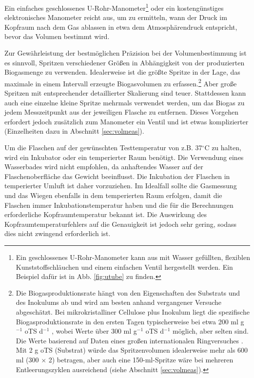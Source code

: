 \documentclass[]{article}
\begin{document}
Ein einfaches geschlossenes U-Rohr-Manometer\footnote{
  Ein geschlossenes U-Rohr-Manometer kann aus mit Wasser gefüllten, flexiblen Kunststoffschläuchen und einem einfachen Ventil hergestellt werden. Ein Beispiel dafür ist in Abb. \ref{fig:utube} zu finden.
} oder ein kostengünstiges elektronisches Manometer reicht aus, um zu ermitteln, wann der Druck im Kopfraum nach dem Gas ablassen in etwa dem Atmosphärendruck entspricht, bevor das Volumen bestimmt wird.

Zur Gewährleistung der bestmöglichen Präzision bei der Volumenbestimmung ist es sinnvoll, Spritzen verschiedener Größen in Abhängigkeit von der produzierten Biogasmenge zu verwenden.
Idealerweise ist die größte Spritze in der Lage, das maximale in einem Intervall erzeugte Biogasvolumen zu erfassen.\footnote{\label{fn:cellrate}Die Biogasproduktionsrate hängt von den Eigenschaften des Substrats und des Inokulums ab und wird am besten anhand vergangener Versuche abgeschätzt.
  Bei mikrokristalliner Cellulose plus Inokulum liegt die spezifische Biogasproduktionsrate in den ersten Tagen typischerweise bei etwa 200 ml g$^{-1}$ oTS d$^{-1}$ , wobei Werte über 300 ml g$^{-1}$ oTS d$^{-1}$ möglich, aber selten sind. Die Werte basierend auf Daten eines großen internationalen Ringversuches \citep{hafnerImprovingInterlaboratoryReproducibility2020}.
  Mit 2 g oTS (Substrat) würde das Spritzenvolumen idealerweise mehr als 600 ml (300 $\times$ 2) betragen, aber auch eine 150-ml-Spritze wäre bei mehreren Entleerungszyklen ausreichend (siehe Abschnitt \ref{sec:volmeas}).}
Aber große Spritzen mit entsprechender detaillierter Skalierung sind teuer.
Stattdessen kann auch eine einzelne kleine Spritze mehrmals verwendet werden, um das Biogas zu jedem Messzeitpunkt aus der jeweiligen Flasche zu entfernen.
Dieses Vorgehen erfordert jedoch zusätzlich zum Manometer ein Ventil und ist etwas komplizierter (Einzelheiten dazu in Abschnitt \ref{sec:volmeas}).

Um die Flaschen auf der gewünschten Testtemperatur von z.B. 37$^\circ$C zu halten, wird ein Inkubator oder ein temperierter Raum benötigt.
Die Verwendung eines Wasserbades wird nicht empfohlen, da anhaftendes Wasser auf der Flaschenoberfläche das Gewicht beeinflusst. 
Die Inkubation der Flaschen in temperierter Umluft ist daher vorzuziehen.
Im Idealfall sollte die Gasmessung und das Wiegen ebenfalls in dem temperierten Raum erfolgen, damit die Flaschen immer Inkubationstemperatur haben und die für die Berechnungen erforderliche Kopfraumtemperatur bekannt ist.
Die Auswirkung des Kopfraumtemperaturfehlers auf die Genauigkeit ist jedoch sehr gering, sodass dies nicht zwingend erforderlich ist.
\end{document}
